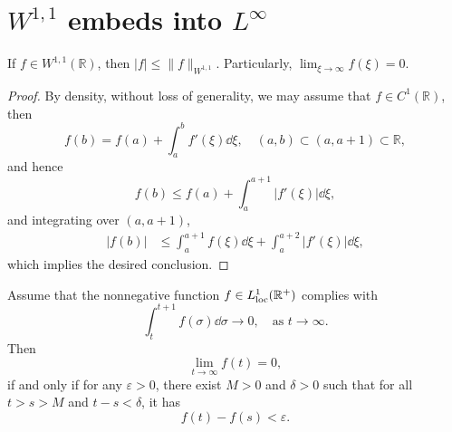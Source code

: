 \section{\texorpdfstring{$W^{1,1}$}{W1,1} embeds into \texorpdfstring{$L^\infty$}{bounded space}}
\begin{lemma}
	If $f\in W^{1,1}(\mathbb{R})$, then $|f|\leq \|f\|_{W^{1,1}}$.
	Particularly, $\lim_{\xi\to\infty}f(\xi) = 0$.
\end{lemma}
\begin{proof}
	By density, without loss of generality,
	we may assume that $f\in C^1(\mathbb{R})$, then
	\[
	f(b) = f(a) + \int_a^b f'(\xi)\dd \xi,\quad (a,b)\subset(a, a+1)\subset\mathbb{R},
	\]
	and hence
	\[
	f(b) \leq f(a) + \int_a^{a+1}|f'(\xi)|\dd\xi,
	\]
	and integrating over $(a, a+1)$,
	\begin{align*}
		|f(b)| &\leq \int_a^{a+1}f(\xi)\dd\xi + \int_a^{a+2}|f'(\xi)|\dd\xi,
	\end{align*}
	which implies the desired conclusion.
\end{proof}

\begin{lemma}
	Assume that the nonnegative function $f\in L^1_{\operatorname*{loc}}(\mathbb{R}^+)$ complies with 
	\begin{equation}
		\label{eq: int01f to 0}
		\int_t^{t+1}f(\sigma)\dd\sigma \to 0,\quad \text{as } t\to\infty.
	\end{equation}
	Then 
	\begin{equation}
		\label{eq: f to 0}
		\lim_{t\to\infty} f(t) = 0,
	\end{equation}
	if and only if for any $\varepsilon > 0$, 
	there exist $M>0$ and $\delta > 0$ such that 
	for all $t>s>M$ and $t-s<\delta$, 
	it has 
	\begin{equation}
		\label{eq: f(t)-f(s) < epsilon}
		f(t) - f(s) < \varepsilon.
	\end{equation}
\end{lemma}

